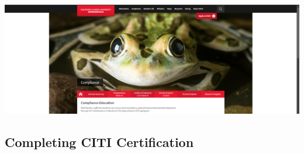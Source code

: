 \documentclass[
]{book}
\begin{document}
\href{https://www.siue.edu/compliance/training/}{\includegraphics[width=1\textwidth,height=\textheight]{images/compliance-education.png}}

\subsection*{Completing CITI Certification}\label{completing-citi-certification}
\end{document}
